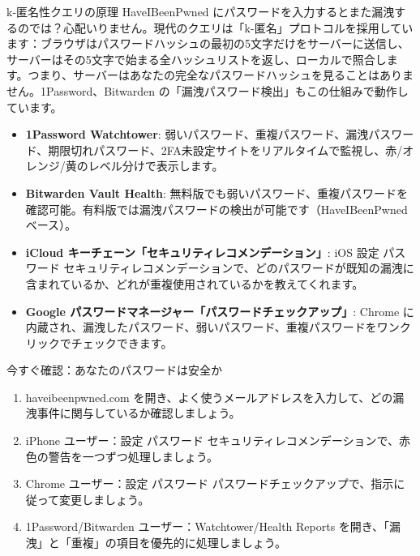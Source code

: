\begin{tcbinfo}{k-匿名性クエリの原理}
HaveIBeenPwned にパスワードを入力するとまた漏洩するのでは？心配いりません。現代のクエリは「k-匿名」プロトコルを採用しています：ブラウザはパスワードハッシュの最初の5文字だけをサーバーに送信し、サーバーはその5文字で始まる全ハッシュリストを返し、ローカルで照合します。つまり、サーバーはあなたの完全なパスワードハッシュを見ることはありません。1Password、Bitwarden の「漏洩パスワード検出」もこの仕組みで動作しています。

\end{tcbinfo}


\begin{itemize}
  \item \textbf{1Password Watchtower}: 弱いパスワード、重複パスワード、漏洩パスワード、期限切れパスワード、2FA未設定サイトをリアルタイムで監視し、赤/オレンジ/黄のレベル分けで表示します。
  \item \textbf{Bitwarden Vault Health}: 無料版でも弱いパスワード、重複パスワードを確認可能。有料版では漏洩パスワードの検出が可能です（HaveIBeenPwned ベース）。
  \item \textbf{iCloud キーチェーン「セキュリティレコメンデーション」}: iOS 設定 パスワード セキュリティレコメンデーションで、どのパスワードが既知の漏洩に含まれているか、どれが重複使用されているかを教えてくれます。
  \item \textbf{Google パスワードマネージャー「パスワードチェックアップ」}: Chrome に内蔵され、漏洩したパスワード、弱いパスワード、重複パスワードをワンクリックでチェックできます。
\end{itemize}

\begin{tcbpractice}{今すぐ確認：あなたのパスワードは安全か}
\begin{enumerate}
  \item haveibeenpwned.com を開き、よく使うメールアドレスを入力して、どの漏洩事件に関与しているか確認しましょう。
  \item iPhone ユーザー：設定 パスワード セキュリティレコメンデーションで、赤色の警告を一つずつ処理しましょう。
  \item Chrome ユーザー：設定 パスワード パスワードチェックアップで、指示に従って変更しましょう。
  \item 1Password/Bitwarden ユーザー：Watchtower/Health Reports を開き、「漏洩」と「重複」の項目を優先的に処理しましょう。
\end{enumerate}

\end{tcbpractice}

